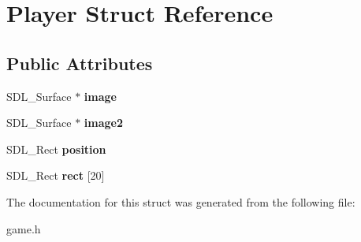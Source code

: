 \hypertarget{structPlayer}{}\section{Player Struct Reference}
\label{structPlayer}
\subsection*{Public Attributes}
\begin{DoxyCompactItemize}
\item 
\mbox{\label{structPlayer_a8f9084cb81f2cdd3e5ce63bc536c0eb7}} 
S\+D\+L\+\_\+\+Surface $\ast$ {\bfseries image}
\item 
\mbox{\label{structPlayer_a8494db8841dc4b48e0da918b4638e8b3}} 
S\+D\+L\+\_\+\+Surface $\ast$ {\bfseries image2}
\item 
\mbox{\label{structPlayer_a326f16b65e24150ec60c27c22b4ec00d}} 
S\+D\+L\+\_\+\+Rect {\bfseries position}
\item 
\mbox{\label{structPlayer_a8d4a332544112f02f6db84f020d78729}} 
S\+D\+L\+\_\+\+Rect {\bfseries rect} \mbox{[}20\mbox{]}
\end{DoxyCompactItemize}


The documentation for this struct was generated from the following file\+:\begin{DoxyCompactItemize}
\item 
game.\+h\end{DoxyCompactItemize}
